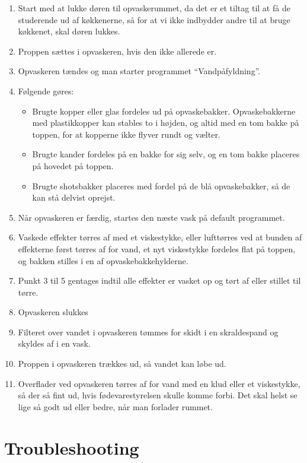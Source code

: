 \begin{enumerate}
    \item Start med at lukke døren til opvaskerummet, da det er et tiltag til at få de studerende ud af køkkenerne,
    så for at vi ikke indbydder andre til at bruge køkkenet, skal døren lukkes.
    \item Proppen sættes i opvaskeren, hvis den ikke allerede er.
    \item Opvaskeren tændes og man starter programmet ``Vandpåfyldning''.
    \item Følgende gøres:
    \begin{itemize}
        \item Brugte kopper eller glas fordeles ud på opvaskebakker. 
        Opvaskebakkerne med plastikkopper kan stables 
        to i højden, og altid med en tom bakke på toppen, for at kopperne ikke 
        flyver rundt og vælter.
        \item Brugte kander fordeles på en bakke for sig selv, og en tom bakke placeres 
        på hovedet på toppen.
        \item Brugte shotsbakker placeres med fordel på de blå opvaskebakker, så de kan stå
        delvist oprejst.
    \end{itemize}
    \item Når opvaskeren er færdig, startes den næste vask på default programmet.
    \item Vaskede effekter tørres af med et viskestykke, eller lufttørres ved at 
    bunden af effekterne først tørres af for vand, et nyt viskestykke fordeles 
    flat på toppen, og bakken stilles i en af opvaskebakkehylderne.
    \item Punkt 3 til 5 gentages indtil alle effekter er vasket op og tørt af eller 
    stillet til tørre.
    \item Opvaskeren slukkes
    \item Filteret over vandet i opvaskeren tømmes for skidt i en skraldespand og 
    skyldes af i en vask.
    \item Proppen i opvaskeren trækkes ud, så vandet kan løbe ud.
    \item Overflader ved opvaskeren tørres af for vand med en klud eller et viskestykke, 
    så der så fint ud, hvis fødevarestyrelsen skulle komme forbi.
    Det skal helst se lige så godt ud eller bedre, når man forlader rummet.
\end{enumerate}

\section{Troubleshooting}
\label{sec:troubleshooting}

